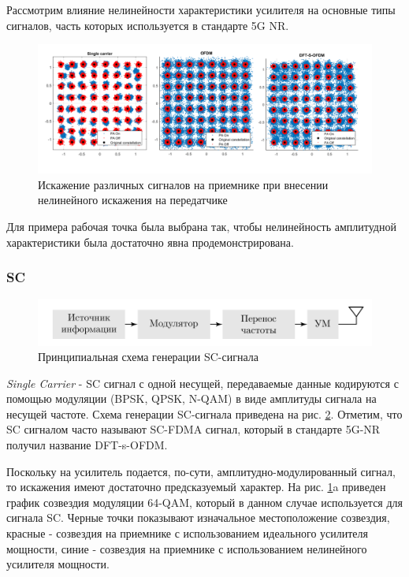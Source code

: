 
Рассмотрим влияние нелинейности характеристики усилителя на основные типы
сигналов, часть которых используется в стандарте 5G NR.

\begin{figure}[h!]
    \centering
    \includegraphics[width=0.95\linewidth]{figs/ofdm_pa_distortions.png}
    \caption{Искажение различных сигналов на приемнике при внесении нелинейного
    искажения на передатчике}
    \label{fig:lls_rapp_distortions_0}
\end{figure}

Для примера рабочая точка была выбрана так, чтобы нелинейность
амплитудной характеристики была достаточно явна продемонстрирована.
\subsubsection{SC}
\begin{figure}[h!]
    \centering
    \includegraphics[scale=1]{figs/sc_scheme.pdf}
    \caption{Принципиальная схема генерации SC-сигнала}
    \label{fig:sc_scheme}
\end{figure}
\textit{Single Carrier} - SC сигнал с одной несущей, передаваемые данные
кодируются с помощью модуляции (BPSK, QPSK, N-QAM) в виде амплитуды сигнала
на несущей частоте. Схема генерации SC-сигнала приведена на рис.
\ref{fig:sc_scheme}. Отметим, что SC сигналом часто называют SC-FDMA
сигнал, который в стандарте 5G-NR получил название DFT-s-OFDM.

Поскольку на усилитель подается, по-сути, амплитудно-модулированный сигнал,
то искажения имеют достаточно предсказуемый характер. На рис.
\ref{fig:lls_rapp_distortions_0}a приведен график созвездия модуляции
64-QAM, который в данном случае используется для сигнала SC. Черные точки
показывают изначальное местоположение созвездия, красные - созвездия на
приемнике с использованием идеального усилителя мощности, синие - созвездия
на приемнике с использованием нелинейного усилителя мощности. 

